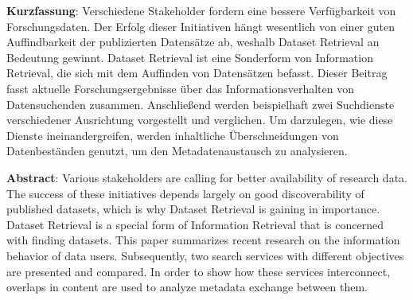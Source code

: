 \textbf{Kurzfassung}: Verschiedene Stakeholder fordern eine bessere
Verfügbarkeit von Forschungsdaten. Der Erfolg dieser Initiativen hängt
wesentlich von einer guten Auffindbarkeit der publizierten Datensätze
ab, weshalb Dataset Retrieval an Bedeutung gewinnt. Dataset Retrieval
ist eine Sonderform von Information Retrieval, die sich mit dem
Auffinden von Datensätzen befasst. Dieser Beitrag fasst aktuelle
Forschungsergebnisse über das Informationsverhalten von Datensuchenden
zusammen. Anschließend werden beispielhaft zwei Suchdienste
verschiedener Ausrichtung vorgestellt und verglichen. Um darzulegen, wie
diese Dienste ineinandergreifen, werden inhaltliche Überschneidungen von
Datenbeständen genutzt, um den Metadatenaustausch zu analysieren.

\textbf{Abstract}: Various stakeholders are calling for better
availability of research data. The success of these initiatives depends
largely on good discoverability of published datasets, which is why
Dataset Retrieval is gaining in importance. Dataset Retrieval is a
special form of Information Retrieval that is concerned with finding
datasets. This paper summarizes recent research on the information
behavior of data users. Subsequently, two search services with different
objectives are presented and compared. In order to show how these
services interconnect, overlaps in content are used to analyze metadata
exchange between them.
